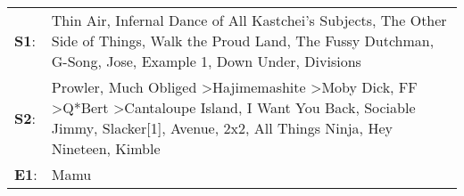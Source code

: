 \begin{supertabular}{p{0.03\textwidth}p{0.92\textwidth}}
 \textbf{S1}:  &                                                                                                                                                                                                   Thin Air\textsuperscript{}, \enspace Infernal Dance of All Kastchei's Subjects\textsuperscript{}, \enspace The Other Side of Things\textsuperscript{}, \enspace Walk the Proud Land\textsuperscript{}, \enspace The Fussy Dutchman\textsuperscript{}, \enspace G-Song\textsuperscript{}, \enspace Jose\textsuperscript{}, \enspace Example 1\textsuperscript{}, \enspace Down Under\textsuperscript{}, \enspace Divisions\textsuperscript{}  \enspace  \\
 \textbf{S2}:  &  Prowler\textsuperscript{}, \enspace Much Obliged\textsuperscript{} \textgreater \enspace Hajimemashite\textsuperscript{} \textgreater \enspace Moby Dick\textsuperscript{}, \enspace FF\textsuperscript{} \textgreater \enspace Q*Bert\textsuperscript{} \textgreater \enspace Cantaloupe Island\textsuperscript{}, \enspace I Want You Back\textsuperscript{}, \enspace Sociable Jimmy\textsuperscript{}, \enspace Slacker[1]\textsuperscript{}, \enspace Avenue\textsuperscript{}, \enspace 2x2\textsuperscript{}, \enspace All Things Ninja\textsuperscript{}, \enspace Hey Nineteen\textsuperscript{}, \enspace Kimble\textsuperscript{}  \enspace  \\
 \textbf{E1}:  &                                                                                                                                                                                                                                                                                                                                                                                                                                                                                                                                                                                                                        Mamu\textsuperscript{}  \enspace  \\
\end{supertabular}
